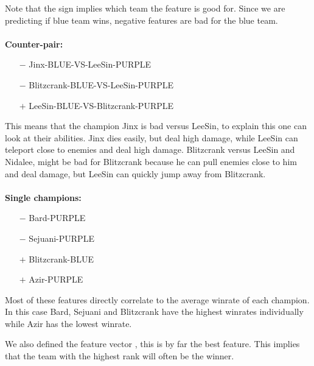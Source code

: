 Note that the sign implies which team the feature is good for. Since we are predicting if blue team wins, negative features are bad for the blue team. 
\\
\\
\textbf{Counter-pair:} 
\begin{itemize}
    \item[$-$] Jinx-BLUE-VS-LeeSin-PURPLE 
    \item[$-$] Blitzcrank-BLUE-VS-LeeSin-PURPLE 
    \item[$+$] LeeSin-BLUE-VS-Blitzcrank-PURPLE 
\end{itemize} 
This means that the champion Jinx is bad versus LeeSin, to explain this one can look at their abilities. Jinx dies easily, but deal high damage, while LeeSin can teleport close to enemies and deal high damage. Blitzcrank versus LeeSin and Nidalee, might be bad for Blitzcrank because he can pull enemies close to him and deal damage, but LeeSin can quickly jump away from Blitzcrank.
\\
\\
\textbf{Single champions:} 
\begin{itemize}
    \item[$-$] Bard-PURPLE 
    \item[$-$] Sejuani-PURPLE
    \item[$+$] Blitzcrank-BLUE 
    \item[$+$] Azir-PURPLE
\end{itemize}

Most of these features directly correlate to the average winrate of each champion. In this case Bard, Sejuani and Blitzcrank have the highest winrates individually while Azir has the lowest winrate.

We also defined the feature vector , this is by far the best feature. This implies that the team with the highest rank will often be the winner.






